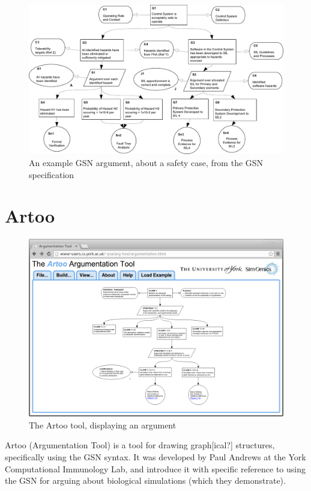 \begin{figure}
  \centering
  \includegraphics[width=\textwidth]{graphics/example_argument.pdf}
  \caption{An example GSN argument, about a safety case,
    from the GSN specification \cite{gsnstandard}}
  \label{fig:crampedex1}
\end{figure}




\section{Artoo}

\begin{figure}
  \centering
  \includegraphics[width=\textwidth]{graphics/artoo_screenshot.png}
  \caption{The Artoo tool, displaying an argument}
  \label{fig:artoo}
\end{figure}

Artoo (Argumentation Tool) is a tool for drawing graph[ical?] structures, specifically using the GSN syntax.
It was developed by Paul Andrews at the York Computational Immunology Lab, and \citet{royal} introduce it with specific reference to using the GSN for arguing about biological simulations (which they demonstrate).

